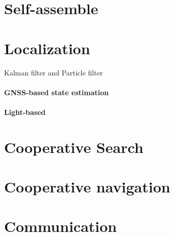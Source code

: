 \documentclass{article}
\begin{document}
	\section{Self-assemble}
		\cite{saldana-2018-modquad-the-flying-modular-structure-that-self-assembles-in-midair}
	\section{Localization}
		Kalman filter and Particle filter
		\paragraph{GNSS-based state estimation}
			\cite{spurny-2017-cooperative-autonomous-search-grasping-and-delivering-in-a-treasure-hunt-scenario-by-a-team-of-uavs}
		\paragraph{Light-based}
			\cite{walter-2018-mutual-localization-of-uavs-based-on-blinking-ultraviolet-markers-and-3d-time-position-hough-transform}
	\section{Cooperative Search}
	\cite{spurny-2017-cooperative-autonomous-search-grasping-and-delivering-in-a-treasure-hunt-scenario-by-a-team-of-uavs}
	\section{Cooperative navigation}
	\cite{spurny-2017-cooperative-autonomous-search-grasping-and-delivering-in-a-treasure-hunt-scenario-by-a-team-of-uavs}
	
	\section{}
	\section{Communication}
	
\end{document}
